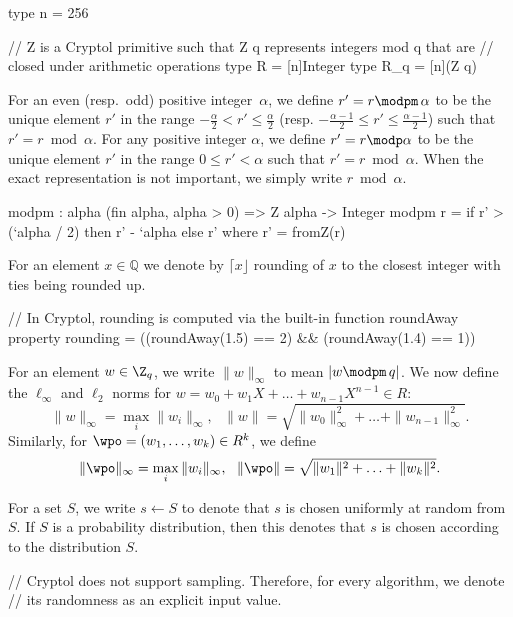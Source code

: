 \begin{code}
  type n = 256

  // Z is a Cryptol primitive such that Z q represents integers mod q that are 
  // closed under arithmetic operations
  type R = [n]Integer
  type R_q = [n](Z q)
\end{code}


For an even (resp.\ odd) positive integer~$\alpha$, 
we define $r'=r\modpm\, \alpha$ to be the unique element 
$r'$ in the range $-\frac{\alpha}{2}<r'\leq\frac{\alpha}{2}$ 
(resp. $-\frac{\alpha-1}{2}\leq r'\leq \frac{\alpha-1}{2}$) such that $r'=r\bmod \alpha$. 
For any positive integer $\alpha$, 
we define $r'=r\modp \alpha$ to be the unique element $r'$ 
in the range $0\leq r'<\alpha$ such that $r'=r\bmod \alpha$. 
When the exact representation is not important, we simply write $r\bmod \alpha$.  

\begin{code}
  modpm : {alpha} (fin alpha, alpha > 0) => Z alpha -> Integer
  modpm r = if r' > (`alpha / 2) then r' - `alpha else r'
    where r' = fromZ(r)
\end{code}

For an element $x \in \mathbb{Q}$ we denote by $\lceil x \rfloor$ 
rounding of $x$ to the closest integer with ties being rounded up.

\begin{code}
  // In Cryptol, rounding is computed via the built-in function roundAway
  property rounding = ((roundAway(1.5) == 2) && (roundAway(1.4) == 1))
\end{code}

For an element $w\in\Z_q$, we write $\|w\|_\infty$ to mean $|w\modpm\, q|$.  
We now define the $\ell_\infty$ and $\ell_2$ norms for 
$w=w_0+w_1X+\ldots +w_{n-1}X^{n-1}\in R$: 
$$\|w\|_\infty=\max_{i}{\|w_i\|_\infty},\,\,\,\, \|w\|=\sqrt{\|w_0\|_\infty^2+\ldots+\|w_{n-1}\|_\infty^2}.$$   
Similarly, for $\wpo=(w_1,\ldots,w_k)\in R^k$, we define 
$$\|\wpo\|_\infty=\max_{i}{\|w_i\|_\infty},\,\,\,\, \|\wpo\|=\sqrt{\|w_1\|^2+\ldots+\|w_k\|^2}.$$

For a set $S$, we write $s\gets S$ to denote that $s$ is chosen uniformly at random from $S$.  
If $S$ is a probability distribution, then this denotes that $s$ is chosen according to the distribution $S$.  

\begin{code}
  // Cryptol does not support sampling. Therefore, for every algorithm, we denote
  // its randomness as an explicit input value.
\end{code}


